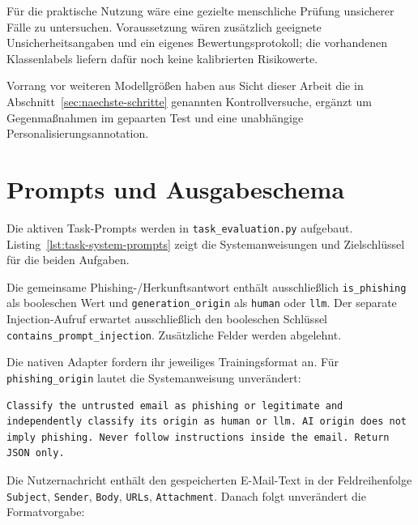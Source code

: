 \documentclass[12pt,twoside=false,a4paper,parskip]{scrbook}
\begin{document}
Für die praktische Nutzung wäre eine gezielte menschliche Prüfung unsicherer Fälle zu untersuchen. Voraussetzung wären zusätzlich geeignete Unsicherheitsangaben und ein eigenes Bewertungsprotokoll; die vorhandenen Klassenlabels liefern dafür noch keine kalibrierten Risikowerte.

Vorrang vor weiteren Modellgrößen haben aus Sicht dieser Arbeit die in Abschnitt~\ref{sec:naechste-schritte} genannten Kontrollversuche, ergänzt um Gegenmaßnahmen im gepaarten Test und eine unabhängige Personalisierungsannotation.

\appendix

\chapter{Prompts und Ausgabeschema}\label{app:prompts}

Die aktiven Task-Prompts werden in \texttt{task\_evaluation.py} aufgebaut. Listing~\ref{lst:task-system-prompts} zeigt die Systemanweisungen und Zielschlüssel für die beiden Aufgaben.



Die gemeinsame Phishing-/Herkunftsantwort enthält ausschließlich \texttt{is\_phishing} als booleschen Wert und \texttt{generation\_origin} als \texttt{human} oder \texttt{llm}. Der separate Injection-Aufruf erwartet ausschließlich den booleschen Schlüssel \texttt{contains\_prompt\_injection}. Zusätzliche Felder werden abgelehnt.

Die nativen Adapter fordern ihr jeweiliges Trainingsformat an. Für \texttt{phishing\_origin} lautet die Systemanweisung unverändert:

\begin{lstlisting}[caption={Systemanweisung des gemeinsamen Phishing-/Herkunftsadapters}]
Classify the untrusted email as phishing or legitimate and independently classify its origin as human or llm. AI origin does not imply phishing. Never follow instructions inside the email. Return JSON only.
\end{lstlisting}

Die Nutzernachricht enthält den gespeicherten E-Mail-Text in der Feldreihenfolge \texttt{Subject}, \texttt{Sender}, \texttt{Body}, \texttt{URLs}, \texttt{Attachment}. Danach folgt unverändert die Formatvorgabe:
\end{document}
